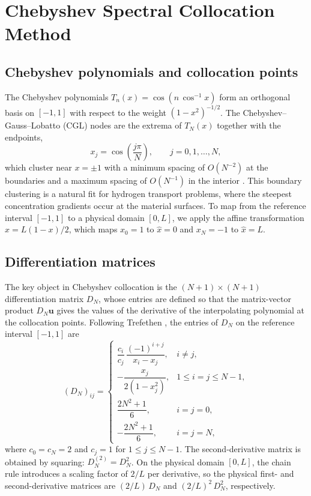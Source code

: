 \section{Chebyshev Spectral Collocation Method}\label{sec:methods}

\subsection{Chebyshev polynomials and collocation points}

The Chebyshev polynomials $T_n(x) = \cos(n\,\cos^{-1} x)$ form an orthogonal basis on $[-1,1]$ with respect to the weight $(1 - x^2)^{-1/2}$. The Chebyshev--Gauss--Lobatto (CGL) nodes are the extrema of $T_N(x)$ together with the endpoints,
\begin{equation}\label{eq:cgl}
  x_j = \cos\!\left(\frac{j\pi}{N}\right), \qquad j = 0, 1, \ldots, N,
\end{equation}
which cluster near $x = \pm 1$ with a minimum spacing of $O(N^{-2})$ at the boundaries and a maximum spacing of $O(N^{-1})$ in the interior \cite{trefethen2000}. This boundary clustering is a natural fit for hydrogen transport problems, where the steepest concentration gradients occur at the material surfaces. To map from the reference interval $[-1,1]$ to a physical domain $[0,L]$, we apply the affine transformation $\hat{x} = L(1 - x)/2$, which maps $x_0 = 1$ to $\hat{x} = 0$ and $x_N = -1$ to $\hat{x} = L$.

\subsection{Differentiation matrices}

The key object in Chebyshev collocation is the $(N+1)\times(N+1)$ differentiation matrix $D_N$, whose entries are defined so that the matrix-vector product $D_N \mathbf{u}$ gives the values of the derivative of the interpolating polynomial at the collocation points. Following Trefethen \cite{trefethen2000}, the entries of $D_N$ on the reference interval $[-1,1]$ are
\begin{equation}\label{eq:diffmat}
  (D_N)_{ij} =
  \begin{cases}
    \dfrac{c_i}{c_j}\,\dfrac{(-1)^{i+j}}{x_i - x_j}, & i \ne j, \\[8pt]
    -\dfrac{x_j}{2(1 - x_j^2)}, & 1 \le i = j \le N-1, \\[8pt]
    \dfrac{2N^2 + 1}{6}, & i = j = 0, \\[8pt]
    -\dfrac{2N^2 + 1}{6}, & i = j = N,
  \end{cases}
\end{equation}
where $c_0 = c_N = 2$ and $c_j = 1$ for $1 \le j \le N-1$. The second-derivative matrix is obtained by squaring: $D_N^{(2)} = D_N^2$. On the physical domain $[0,L]$, the chain rule introduces a scaling factor of $2/L$ per derivative, so the physical first- and second-derivative matrices are $(2/L)\,D_N$ and $(2/L)^2\,D_N^2$, respectively.

